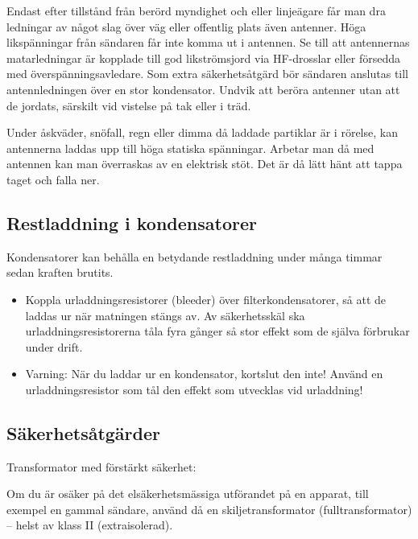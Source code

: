 Endast efter tillstånd från berörd myndighet och eller linjeägare får
man dra ledningar av något slag över väg eller offentlig plats även antenner.
Höga likspänningar från sändaren får inte komma ut i antennen.
Se till att antennernas matarledningar är kopplade till god likströmsjord
via HF-drosslar eller försedda med överspänningsavledare.
Som extra säkerhetsåtgärd bör sändaren anslutas till antennledningen över en
stor kondensator.
Undvik att beröra antenner utan att de jordats, särskilt vid vistelse
på tak eller i träd.

Under åskväder, snöfall, regn eller dimma då laddade partiklar är i
rörelse, kan antennerna laddas upp till höga statiska spänningar.
Arbetar man då med antennen kan man överraskas av en elektrisk stöt.
Det är då lätt hänt att tappa taget och falla ner.

\subsection{Restladdning i kondensatorer}

Kondensatorer kan behålla en betydande restladdning under många timmar
sedan kraften brutits.

\begin{itemize}
\item Koppla urladdningsresistorer (bleeder) över filterkondensatorer,
  så att de laddas ur när matningen stängs av.
  Av säkerhetsskäl ska urladdningsresistorerna tåla fyra gånger så stor effekt
  som de själva förbrukar under drift.
\item Varning: När du laddar ur en kondensator, kortslut den inte!
  Använd en urladdningsresistor som tål den effekt som utvecklas vid urladdning!
\end{itemize}

\subsection{Säkerhetsåtgärder}

Transformator med förstärkt säkerhet:

\begin{center}
\begin{minipage}{0.19\columnwidth}
\Huge{\warningsymbol}
\end{minipage}
\begin{minipage}{0.7\columnwidth}
Om du är osäker på det elsäkerhetsmässiga utförandet på en
apparat, till exempel en gammal sändare, använd då en skiljetransformator
(fulltransformator) -- helst av klass II (extraisolerad).
\end{minipage}
\end{center}


